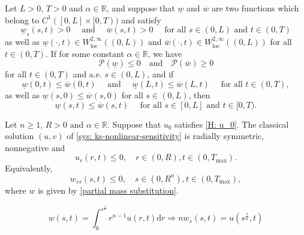 \begin{frame}
\begin{lemma}\label{comparision principle}
	Let $L>0$, $T>0$ and $\alpha\in\mathbb{R}$, and suppose that $\underline{w}$ and $\overline{w}$ are two functions which belong to $C^1([0, L]\times [0, T))$ and satisfy
	\begin{equation}\nonumber
		\underline{w}_{s}(s, t)>0 \quad\text { and }\quad \overline{w}(s, t)>0 \quad\text { for all } s \in(0, L) \text { and } t \in(0, T)
	\end{equation}
as well as $\underline{w}(\cdot, t) \in W_{\mathrm{loc}}^{2, \infty}((0, L))$ and $\overline{w}(\cdot, t) \in W_{\mathrm{loc}}^{2, \infty}((0, L))$ for all  $t \in(0, T)$.
If for some constant $\alpha\in\mathbb{R}$,  we have
    \begin{equation}\nonumber
		\mathcal{P}(\underline{w}) \leqslant 0\quad\text{and}\quad \mathcal{P}(\overline{w})\geqslant0 
	\end{equation}
    for all  $t \in(0, T)$ and a.e. $s \in(0, L)$,
and if 
\begin{equation}\nonumber
	\underline{w}(0, t) \leqslant \overline{w}(0, t)  \quad\text { and } \quad\underline{w}(L, t) \leqslant \overline{w}(L, t) \quad\text { for all } t \in(0, T),
\end{equation}
as well as $\underline{w}(s, 0) \leqslant \overline{w}(s, 0)$  for all $s \in(0, L)$,
then
\begin{equation}\nonumber
	\underline{w}(s, t) \leqslant \overline{w}(s, t)  \quad\text { for all } s \in[0, L]  \text { and }  t \in[0, T).
\end{equation}
\end{lemma}
\end{frame}


\begin{frame}
\begin{lemma}\label{monotony in spatial variable}
    Let $n\geqslant1$, $R>0$ and $\alpha\in\mathbb{R}$.
	Suppose that $u_0$ satisfies \eqref{H: u_0}. The classical solution $(u, v)$ of \eqref{sys: ks-nonlinear-sensitivity} is radially symmetric, nonnegative and
	\begin{equation}\label{eq:u decrease}
		u_{r}(r, t) \leqslant 0, \quad r \in(0, R), t \in\left(0, T_{\max }\right).
	\end{equation}
Equivalently,
	\begin{equation}\nonumber
		w_{s s}(s, t) \leqslant 0, \quad s \in(0, R^{n}), t \in\left(0, T_{\max }\right),
	\end{equation}
where $w$ is given by \eqref{partial mass substitution}.
\end{lemma}
\[w(s, t)=\int_{0}^{s^{\frac{1}{n}}} r^{n-1} u(r, t) \mathrm{d} r\Rightarrow nw_s(s,t)=u(s^{\frac1n}, t)\]
\end{frame}

